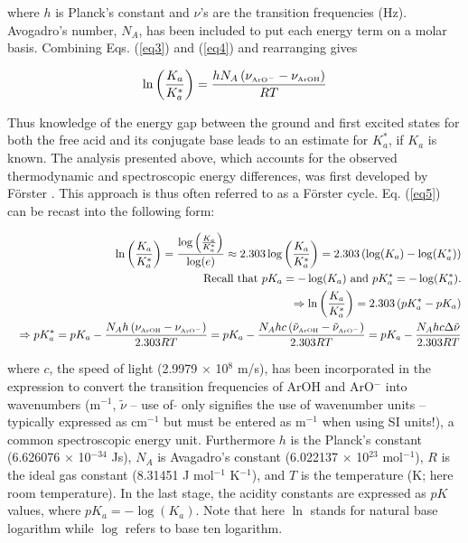 \documentclass[byrevtex,amssymb,aps,pra,floatfix,letterpaper]{revtex4}
\begin{document}
\noindent
where $h$ is Planck's constant and $\nu$'s are the transition frequencies (Hz). Avogadro's number, $N_A$, has been included to put each energy term on a molar basis. Combining Eqs. (\ref{eq3}) and (\ref{eq4}) and rearranging gives

\begin{equation}
\label{eq5}
\ln\left(\frac{K_a}{K_a^*}\right) = \frac{hN_A\left(\nu_{\textnormal{\tiny ArO}^-} - \nu_\textnormal{\tiny ArOH}\right)}{RT}
\end{equation}

\noindent
Thus knowledge of the energy gap between the ground and first excited states for both the free acid and its conjugate base leads to an estimate for $K_a^*$, if $K_a$ is known. The analysis presented above, which accounts for the observed thermodynamic and spectroscopic energy differences, was first developed by F\"orster \cite{FORSTER}. This approach is thus often referred to as a F\"orster cycle. Eq. (\ref{eq5}) can be recast into the following form:

\begin{eqnarray}
\label{eq6}
& & \ln\left(\frac{K_a}{K_a^*}\right) = \frac{\log\left(\frac{K_a}{K_a^*}\right)}{\log(e)}\approx 2.303\log\left(\frac{K_a}{K_a^*}\right) = 2.303\left(\log(K_a) - \log(K_a^*)\right)\\
\nonumber
& & \textnormal{Recall that }pK_a = -\log(K_a)\textnormal{ and }pK_a^* = -\log(K_a^*).\\
\nonumber
& & \Rightarrow \ln\left(\frac{K_a}{K_a^*}\right) = 2.303\left(pK_a^* - pK_a\right)\\
\nonumber
& & \Rightarrow pK_a^* = pK_a - \frac{N_Ah\left(\nu_\textnormal{\tiny ArOH} - \nu_{\textnormal{\tiny ArO}^-}\right)}{2.303RT}
= pK_a - \frac{N_Ahc\left(\tilde{\nu}_\textnormal{\tiny ArOH} - \tilde{\nu}_{\textnormal{\tiny ArO}^-}\right)}{2.303RT}
= pK_a - \frac{N_Ahc\Delta\tilde{\nu}}{2.303RT}
\end{eqnarray}

\noindent
where $c$, the speed of light (2.9979 $\times$ 10$^8$ m/s), has been incorporated in the expression to convert the transition frequencies of ArOH and ArO$^-$ into wavenumbers (m$^{-1}$, $\tilde{\nu}$ -- use of $\tilde{}$ only signifies the use of wavenumber units -- typically expressed as cm$^{-1}$ but must be entered as m$^{-1}$ when using SI units!), a common spectroscopic energy unit. Furthermore $h$ is the Planck's constant (6.626076 $\times$ 10$^{-34}$ Js), $N_A$ is Avagadro's constant (6.022137 $\times$ 10$^{23}$ mol$^{-1}$), $R$ is the ideal gas constant (8.31451 J mol$^{-1}$ K$^{-1}$), and $T$ is the temperature (K; here room temperature). In the last stage, the acidity constants are expressed as $pK$ values, where $pK_a = -\log(K_a)$. Note that here $\ln$ stands for natural base logarithm while $\log$ refers to base ten logarithm.
\end{document}
